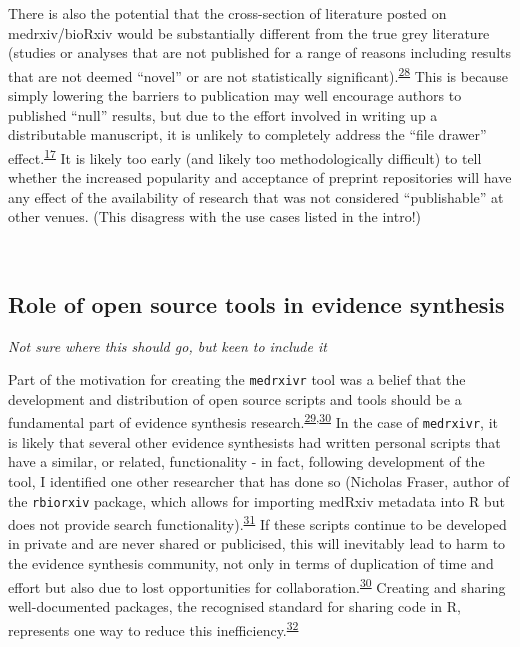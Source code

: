 \documentclass[a4paper, twoside]{templates/ociamthesis}
\begin{document}
There is also the potential that the cross-section of literature posted on medrxiv/bioRxiv would be substantially different from the true grey literature (studies or analyses that are not published for a range of reasons including results that are not deemed ``novel'' or are not statistically significant).\textsuperscript{\protect\hyperlink{ref-song2010}{28}} This is because simply lowering the barriers to publication may well encourage authors to published ``null'' results, but due to the effort involved in writing up a distributable manuscript, it is unlikely to completely address the ``file drawer'' effect.\textsuperscript{\protect\hyperlink{ref-rosenthal1979}{17}} It is likely too early (and likely too methodologically difficult) to tell whether the increased popularity and acceptance of preprint repositories will have any effect of the availability of research that was not considered ``publishable'' at other venues. (This disagress with the use cases listed in the intro!)

~

\hypertarget{role-of-open-source-tools-in-evidence-synthesis}{%
\subsection{Role of open source tools in evidence synthesis}\label{role-of-open-source-tools-in-evidence-synthesis}}

\emph{Not sure where this should go, but keen to include it}

Part of the motivation for creating the \texttt{medrxivr} tool was a belief that the development and distribution of open source scripts and tools should be a fundamental part of evidence synthesis research.\textsuperscript{\protect\hyperlink{ref-goldacre2019b}{29},\protect\hyperlink{ref-mckiernan2016c}{30}} In the case of \texttt{medrxivr}, it is likely that several other evidence synthesists had written personal scripts that have a similar, or related, functionality - in fact, following development of the tool, I identified one other researcher that has done so (Nicholas Fraser, author of the \texttt{rbiorxiv} package, which allows for importing medRxiv metadata into R but does not provide search functionality).\textsuperscript{\protect\hyperlink{ref-rbiorxiv}{31}} If these scripts continue to be developed in private and are never shared or publicised, this will inevitably lead to harm to the evidence synthesis community, not only in terms of duplication of time and effort but also due to lost opportunities for collaboration.\textsuperscript{\protect\hyperlink{ref-mckiernan2016c}{30}} Creating and sharing well-documented packages, the recognised standard for sharing code in R, represents one way to reduce this inefficiency.\textsuperscript{\protect\hyperlink{ref-vuorre2020}{32}}
\end{document}
